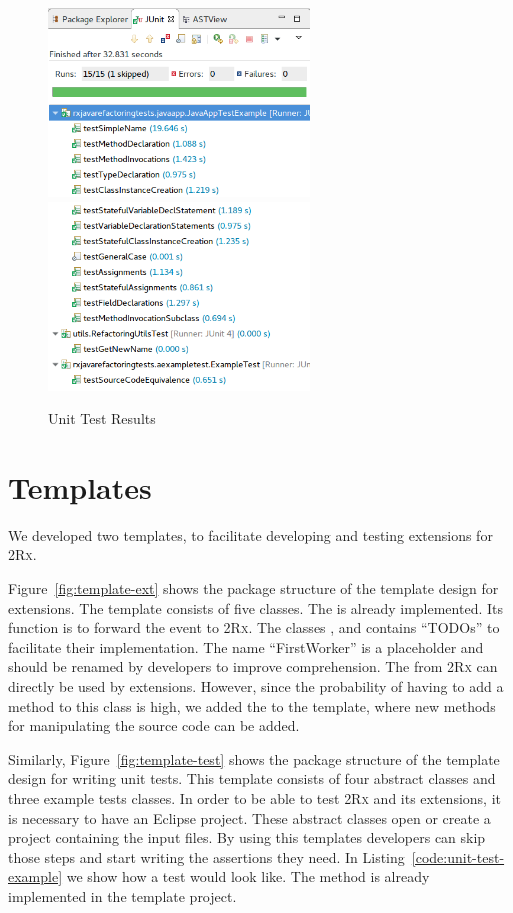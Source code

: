 \documentclass[type=bsc,accentcolor=tud9c]{tudthesis}
\newcommand{\toolcore}{\textsc{2Rx}}
\begin{document}
\begin{figure}[H]
\begin{center}
\includegraphics[height=5cm]{unit-tests/unit-tests-results1.png}
\includegraphics[height=5cm]{unit-tests/unit-tests-results2.png}
\end{center}
\caption{Unit Test Results}
\label{fig:unit-test-results}
\end{figure}

\section{Templates}
We developed two templates, to facilitate developing and testing extensions for \toolcore{}.

Figure~\ref{fig:template-ext} shows the package structure of the template design for extensions. The template consists of five classes. The  is already implemented. Its function is to forward the event to \toolcore{}. The classes ,  and  contains ``TODOs'' to facilitate their implementation. The name ``FirstWorker'' is a placeholder and should be renamed by developers to improve comprehension. The  from \toolcore{} can directly be used by extensions. However, since the probability of having to add a method to this class is high, we added the  to the template, where new methods for manipulating the source code can be added.

Similarly, Figure~\ref{fig:template-test} shows the package structure of the template design for writing unit tests. This template consists of four abstract classes and three example tests classes. In order to be able to test \toolcore{} and its extensions, it is necessary to have an Eclipse project. These abstract classes open or create a project containing the input files. By using this templates developers can skip those steps and start writing the assertions they need. In Listing~\ref{code:unit-test-example} we show how a test would look like. The method  is already implemented in the template project.
\end{document}
